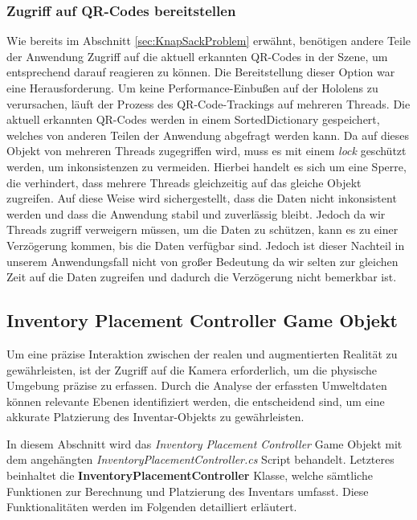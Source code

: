 
\subsubsection{Zugriff auf QR-Codes bereitstellen}
Wie bereits im Abschnitt \ref{sec:KnapSackProblem} erwähnt, benötigen andere Teile der Anwendung Zugriff auf
die aktuell erkannten QR-Codes in der Szene, um entsprechend darauf reagieren zu können. Die Bereitstellung dieser Option war eine Herausforderung.
Um keine Performance-Einbußen auf der Hololens zu verursachen, läuft der Prozess des QR-Code-Trackings auf
mehreren Threads. Die aktuell erkannten QR-Codes werden in einem SortedDictionary gespeichert, welches von anderen Teilen
der Anwendung abgefragt werden kann. Da auf dieses Objekt von mehreren Threads zugegriffen wird, muss es mit einem
\textit{lock} geschützt werden, um inkonsistenzen zu vermeiden. Hierbei handelt es sich um eine Sperre, die verhindert,
dass mehrere Threads gleichzeitig auf das gleiche Objekt zugreifen. Auf diese Weise wird sichergestellt, dass die Daten
nicht inkonsistent werden und dass die Anwendung stabil und zuverlässig bleibt. Jedoch da wir Threads zugriff verweigern
müssen, um die Daten zu schützen, kann es zu einer Verzögerung kommen, bis die Daten verfügbar sind. Jedoch ist dieser
Nachteil in unserem Anwendungsfall nicht von großer Bedeutung da wir selten zur gleichen Zeit auf die Daten zugreifen und
dadurch die Verzögerung nicht bemerkbar ist.

\subsection{Inventory Placement Controller Game Objekt} 
Um eine präzise Interaktion zwischen der realen und augmentierten Realität zu gewährleisten, ist der Zugriff auf die
Kamera erforderlich, um die physische Umgebung präzise zu erfassen. Durch die Analyse der erfassten Umweltdaten können
relevante Ebenen identifiziert werden, die entscheidend sind, um eine akkurate Platzierung des Inventar-Objekts zu gewährleisten.

In diesem Abschnitt wird das \textit{Inventory Placement Controller} Game Objekt mit dem angehängten
\textit{InventoryPlacementController.cs} Script behandelt. Letzteres beinhaltet die \textbf{InventoryPlacementController}
Klasse, welche sämtliche Funktionen zur Berechnung und Platzierung des Inventars umfasst. Diese Funktionalitäten werden
im Folgenden detailliert erläutert.

